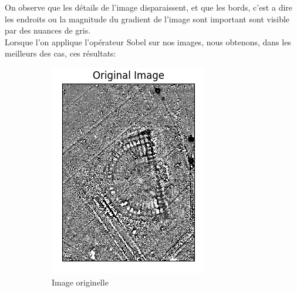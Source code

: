 \documentclass[a4paper, 12pt, titlepage, oneside, french]{article}
\begin{document}
	On observe que les détails de l'image disparaissent, et que les bords, c'est a dire les endroits ou la magnitude du gradient de l'image sont important sont visible par des nuances de gris.\\
	Lorsque l'on applique l'opérateur Sobel sur nos images, nous obtenons, dans les meilleurs des cas, ces résultats:
	\begin{figure}[]
		\centering
		\begin{subfigure}[b]{0.4\linewidth}
			\includegraphics[width=\linewidth]{Sobel1b.png}
			\caption{Image originelle}
		\end{subfigure}
		\begin{subfigure}[b]{0.4\linewidth}

\end{subfigure}
\end{figure}
\end{document}
